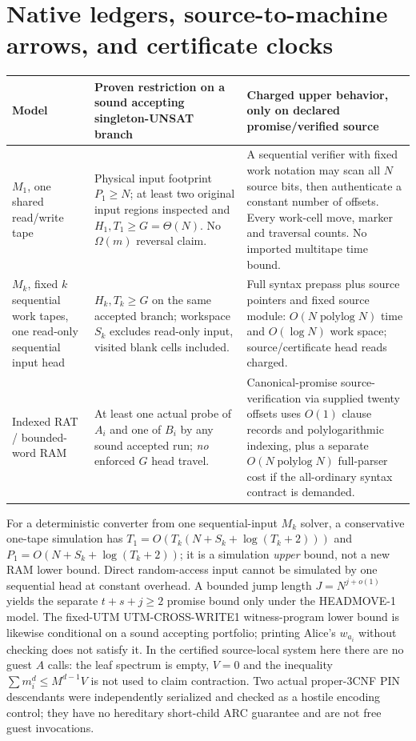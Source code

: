 \documentclass[11pt]{article}
\begin{document}
\section{Native ledgers, source-to-machine arrows, and certificate clocks}
\begin{center}\small
\begin{tabular}{p{.17\linewidth}p{.36\linewidth}p{.37\linewidth}}
\toprule
Model & Proven restriction on a sound accepting singleton-UNSAT branch & Charged upper behavior, only on declared promise/verified source\\
\midrule
$M_1$, one shared read/write tape & Physical input footprint $P_1\ge N$; at least two original input regions inspected and $H_1,T_1\ge G=\Theta(N)$. No $\Omega(m)$ reversal claim. & A sequential verifier with fixed work notation may scan all $N$ source bits, then authenticate a constant number of offsets. Every work-cell move, marker and traversal counts. No imported multitape time bound.\\
$M_k$, fixed $k$ sequential work tapes, one read-only sequential input head & $H_k,T_k\ge G$ on the same accepted branch; workspace $S_k$ excludes read-only input, visited blank cells included. & Full syntax prepass plus source pointers and fixed source module: $O(N\operatorname{polylog}N)$ time and $O(\log N)$ work space; source/certificate head reads charged.\\
Indexed RAT / bounded-word RAM & At least one actual probe of $A_i$ and one of $B_i$ by any sound accepted run; \emph{no} enforced $G$ head travel. & Canonical-promise source-verification via supplied twenty offsets uses $O(1)$ clause records and polylogarithmic indexing, plus a separate $O(N\operatorname{polylog}N)$ full-parser cost if the all-ordinary syntax contract is demanded.\\
\bottomrule
\end{tabular}
\end{center}
For a deterministic converter from one sequential-input $M_k$ solver, a conservative one-tape simulation has $T_1=O(T_k(N+S_k+\log(T_k+2)))$ and $P_1=O(N+S_k+\log(T_k+2))$; it is a simulation \emph{upper} bound, not a new RAM lower bound. Direct random-access input cannot be simulated by one sequential head at constant overhead. A bounded jump length $J=N^{j+o(1)}$ yields the separate $t+s+j\ge2$ promise bound only under the HEADMOVE-1 model. The fixed-UTM UTM-CROSS-WRITE1 witness-program lower bound is likewise conditional on a sound accepting portfolio; printing Alice's $w_{a_i}$ without checking does not satisfy it. In the certified source-local system here there are no guest $A$ calls: the leaf spectrum is empty, $V=0$ and the inequality $\sum m_i^d\le M^{d-1}V$ is not used to claim contraction. Two actual proper-3CNF PIN descendants were independently serialized and checked as a hostile encoding control; they have no hereditary short-child ARC guarantee and are not free guest invocations.
\end{document}

